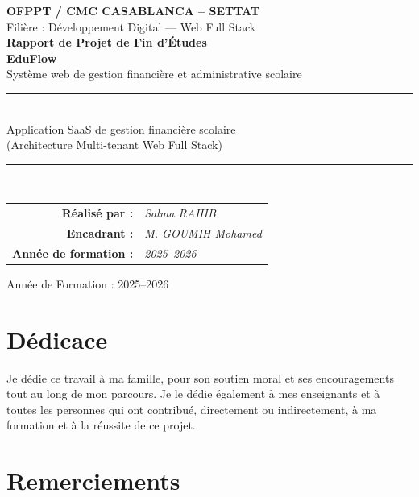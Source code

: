 \documentclass[12pt,a4paper]{report}
\begin{document}
\begin{titlepage}
    \centering
    \vspace*{0.5cm}
    {\large \textbf{OFPPT / CMC CASABLANCA – SETTAT}}\\[0.2cm]
    {\large Filière : Développement Digital — Web Full Stack}\\[1.5cm]

    {\Large \textbf{Rapport de Projet de Fin d'Études}}\\[1cm]

    {\Huge \textbf{EduFlow}}\\[0.4cm]
    {\Large Système web de gestion financière et administrative scolaire}\\[1.5cm]

    \rule{0.85\textwidth}{0.5pt}\\[0.8cm]
    {\large Application SaaS de gestion financière scolaire \\ (Architecture Multi-tenant Web Full Stack)}\\[0.8cm]
    \rule{0.85\textwidth}{0.5pt}\\[2cm]

    \begin{tabular}{rl}
        \textbf{Réalisé par :} & \textit{Salma RAHIB} \\
        \textbf{Encadrant :} & \textit{M. GOUMIH Mohamed} \\
        \textbf{Année de formation :} & \textit{2025--2026} \\
    \end{tabular}

    \vfill
    {\large Année de Formation : 2025--2026}
\end{titlepage}


\chapter*{Dédicace}

Je dédie ce travail à ma famille, pour son soutien moral et ses encouragements tout au long de mon parcours. Je le dédie également à mes enseignants et à toutes les personnes qui ont contribué, directement ou indirectement, à ma formation et à la réussite de ce projet.

\chapter*{Remerciements}
\end{document}

